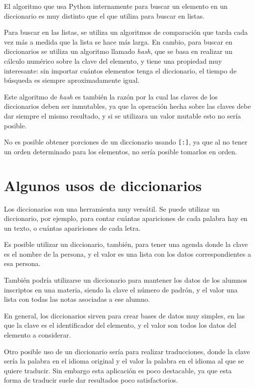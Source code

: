 \begin{sabias_que}
El algoritmo que usa Python internamente para buscar un elemento en un
diccionario es muy distinto que el que utiliza para buscar en listas.

Para buscar en las listas, se utiliza un algoritmos de comparación que
tarda cada vez más a medida que la lista se hace más larga.  En cambio,
para buscar en diccionarios se utiliza un algoritmo llamado \emph{hash},
que se basa en realizar un cálculo numérico sobre la clave del elemento,
y tiene una propiedad muy interesante: sin importar cuántos elementos
tenga el diccionario, el tiempo de búsqueda es siempre aproximadamente
igual.

Este algoritmo de \emph{hash} es también la razón por la cual las claves de
los diccionarios deben ser inmutables, ya que la operación hecha sobre las
claves debe dar siempre el mismo resultado, y si se utilizara un valor
mutable esto no sería posible.
\end{sabias_que}

No es posible obtener porciones de un diccionario usando \lstinline![:]!,
ya que al no tener un orden determinado para los elementos, no sería
posible tomarlos en orden.

\section{Algunos usos de diccionarios}

Los diccionarios son una herramienta muy versátil.  Se puede utilizar un
diccionario, por ejemplo, para contar cuántas apariciones de cada palabra
hay en un texto, o cuántas apariciones de cada letra.

Es posible utilizar un diccionario, también, para tener una agenda donde la
clave es el nombre de la persona, y el valor es una lista con los datos
correspondientes a esa persona.

También podría utilizarse un diccionario para mantener los datos de los
alumnos inscriptos en una materia, siendo la clave el número de padrón, y
el valor una lista con todas las notas asociadas a ese alumno.

En general, los diccionarios sirven para crear bases de datos muy simples,
en las que la clave es el identificador del elemento, y el valor son todos
los datos del elemento a considerar.

Otro posible uso de un diccionario sería para realizar
traducciones, donde la clave sería la palabra en el idioma original y el
valor la palabra en el idioma al que se quiere traducir.  Sin embargo esta
aplicación es poco destacable, ya que esta forma de traducir suele dar
resultados poco satisfactorios.

